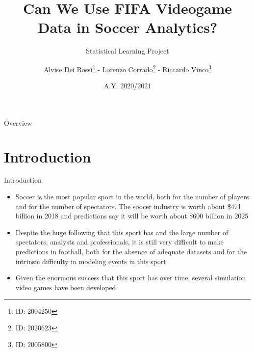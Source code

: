 \documentclass[aspectratio=169,xcolor=dvipsnames]{beamer}
\title[short title]{Can We Use FIFA Videogame Data in Soccer Analytics?}
\subtitle{Statistical Learning Project}
\author {Alvise Dei Rossi\footnote{ID: 2004250} - Lorenzo Corrado\footnote{ID: 2020623} - Riccardo Vinco\footnote{ID: 2005800}}
\institute[UNIPD] %
{
    Department of Mathematics "Tullio Levi-Civita" \\
    MS in Data Science \\
    University of Padua
    \vskip 3pt
}
\date{A.Y. 2020/2021} %
\begin{document}

\begin{frame}
    \titlepage
\end{frame}

\begin{frame}{Overview}
    \tableofcontents
\end{frame}


\section{Introduction}

\begin{frame}{Introduction}
\begin{itemize}
    \item Soccer is the most popular sport in the world, both for the number of players and for the number of spectators. The soocer industry is worth about \$471 billion in 2018 and predictions say it will be worth about \$600 billion in 2025 \cite{1}
    
    \item Despite the huge following that this sport has and the large number of spectators, analysts and professionals, it is still very difficult to make predictions in football, both for the absence of adequate datasets and for the intrinsic difficulty in modeling events in this sport \cite{2}
    
    \item Given the enormous success that this sport has over time, several simulation video games have been developed.
\end{itemize}
\end{frame}

\end{document}
